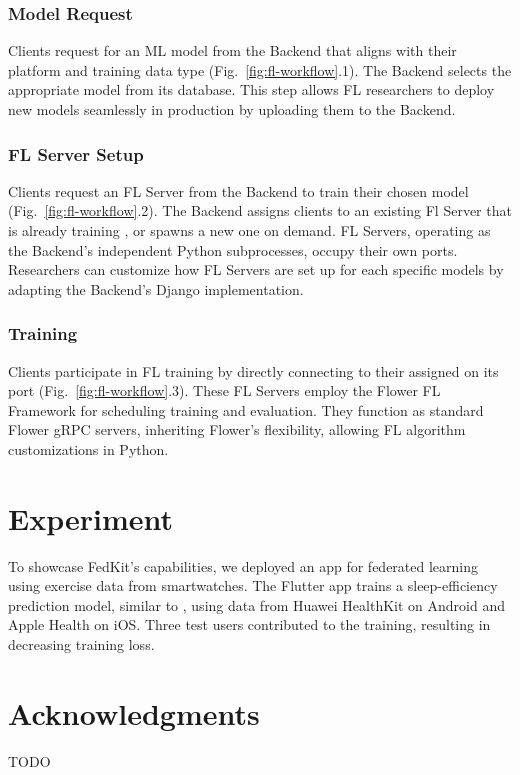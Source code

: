 \documentclass[letterpaper]{article} %
\begin{document}
\subsubsection{Model Request}
Clients request for an ML model from the Backend that
aligns with their platform and training data type
(Fig.~\ref{fig:fl-workflow}.1).
The Backend selects the appropriate model \model{} from its database.
This step allows FL researchers to deploy new models seamlessly
in production by uploading them to the Backend.

\subsubsection{FL Server Setup}
Clients request an FL Server from the Backend to
train their chosen model \model{}
(Fig.~\ref{fig:fl-workflow}.2).
The Backend assigns clients to an existing Fl Server \fs{} that
is already training \model{},
or spawns a new one on demand.
FL Servers, operating as the Backend's independent Python subprocesses,
occupy their own ports.
Researchers can customize how FL Servers are set up for each specific models by
adapting the Backend's Django implementation.

\subsubsection{Training}
Clients participate in FL training by directly connecting to
their assigned \fs{} on its port
(Fig.~\ref{fig:fl-workflow}.3).
These FL Servers employ the Flower FL Framework for
scheduling training and evaluation.
They function as standard Flower gRPC servers,
inheriting Flower's flexibility,
allowing FL algorithm customizations in Python.

\section{Experiment}
To showcase FedKit's capabilities,
we deployed an app for federated learning using exercise data from smartwatches.
The Flutter app trains a sleep-efficiency prediction model,
similar to \cite{khoa2022fedmcrnn},
using data from Huawei HealthKit on Android and Apple Health on iOS.
Three test users contributed to the training,
resulting in decreasing training loss.

\appendix

\section*{Acknowledgments}
TODO

\bigskip


\end{document}
